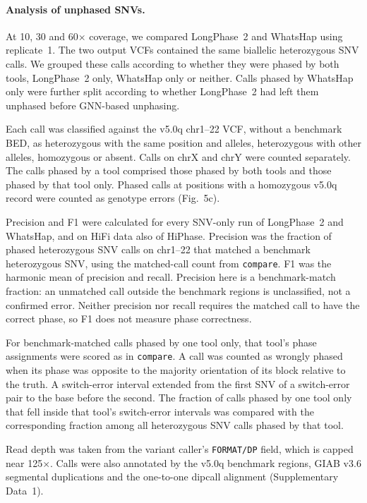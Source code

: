 \documentclass[11pt,a4paper]{article}
\newcommand{\toolname}{LongPhase~2\xspace}
\newcommand{\whatshap}{WhatsHap\xspace}
\begin{document}
\paragraph{Analysis of unphased SNVs.} At 10, 30 and 60$\times$ coverage, we compared \toolname and \whatshap using replicate~1. The two output VCFs contained the same biallelic heterozygous SNV calls. We grouped these calls according to whether they were phased by both tools, \toolname only, \whatshap only or neither. Calls phased by \whatshap only were further split according to whether \toolname had left them unphased before GNN-based unphasing.

Each call was classified against the v5.0q chr1--22 VCF, without a benchmark BED, as heterozygous with the same position and alleles, heterozygous with other alleles, homozygous or absent. Calls on chrX and chrY were counted separately. The calls phased by a tool comprised those phased by both tools and those phased by that tool only. Phased calls at positions with a homozygous v5.0q record were counted as genotype errors (Fig.~5c).

Precision and F1 were calculated for every SNV-only run of \toolname and \whatshap, and on HiFi data also of HiPhase. Precision was the fraction of phased heterozygous SNV calls on chr1--22 that matched a benchmark heterozygous SNV, using the matched-call count from \texttt{compare}. F1 was the harmonic mean of precision and recall. Precision here is a benchmark-match fraction: an unmatched call outside the benchmark regions is unclassified, not a confirmed error. Neither precision nor recall requires the matched call to have the correct phase, so F1 does not measure phase correctness.

For benchmark-matched calls phased by one tool only, that tool's phase assignments were scored as in \texttt{compare}. A call was counted as wrongly phased when its phase was opposite to the majority orientation of its block relative to the truth. A switch-error interval extended from the first SNV of a switch-error pair to the base before the second. The fraction of calls phased by one tool only that fell inside that tool's switch-error intervals was compared with the corresponding fraction among all heterozygous SNV calls phased by that tool.

Read depth was taken from the variant caller's \texttt{FORMAT/DP} field, which is capped near 125$\times$. Calls were also annotated by the v5.0q benchmark regions, GIAB v3.6 segmental duplications and the one-to-one dipcall alignment (Supplementary Data~1).
\end{document}
